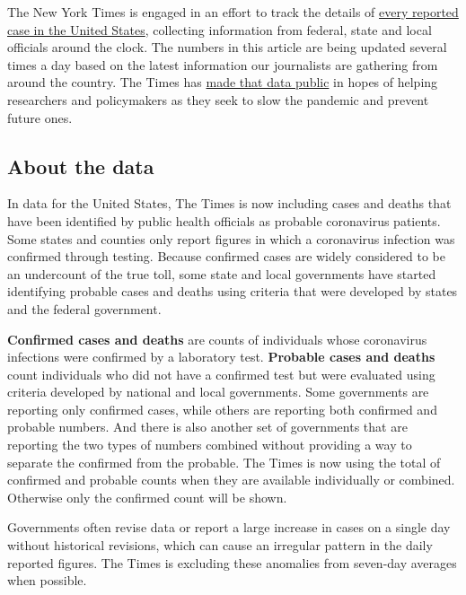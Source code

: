 The New York Times is engaged in an effort to track the details of
\href{https://www.nytimes3xbfgragh.onion/interactive/2020/us/coronavirus-us-cases.html}{every
reported case in the United States}, collecting information from
federal, state and local officials around the clock. The numbers in this
article are being updated several times a day based on the latest
information our journalists are gathering from around the country. The
Times has
\href{https://www.nytimes3xbfgragh.onion/article/coronavirus-county-data-us.html?action=click\&module=Spotlight\&pgtype=Homepage}{made
that data public} in hopes of helping researchers and policymakers as
they seek to slow the pandemic and prevent future ones.

\hypertarget{about-the-data}{%
\subsection{About the data}\label{about-the-data}}

In data for the United States, The Times is now including cases and
deaths that have been identified by public health officials as probable
coronavirus patients. Some states and counties only report figures in
which a coronavirus infection was confirmed through testing. Because
confirmed cases are widely considered to be an undercount of the true
toll, some state and local governments have started identifying probable
cases and deaths using criteria that were developed by states and the
federal government.

\textbf{Confirmed cases and deaths} are counts of individuals whose
coronavirus infections were confirmed by a laboratory test.
\textbf{Probable cases and deaths} count individuals who did not have a
confirmed test but were evaluated using criteria developed by national
and local governments. Some governments are reporting only confirmed
cases, while others are reporting both confirmed and probable numbers.
And there is also another set of governments that are reporting the two
types of numbers combined without providing a way to separate the
confirmed from the probable. The Times is now using the total of
confirmed and probable counts when they are available individually or
combined. Otherwise only the confirmed count will be shown.

Governments often revise data or report a large increase in cases on a
single day without historical revisions, which can cause an irregular
pattern in the daily reported figures. The Times is excluding these
anomalies from seven-day averages when possible.

